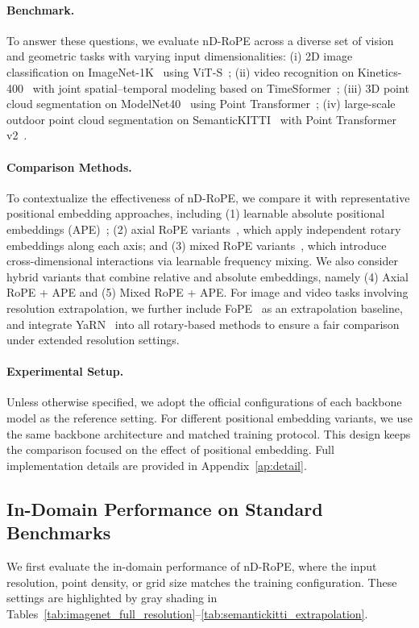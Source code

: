 \documentclass{article}
\theoremstyle{plain}
\theoremstyle{definition}
\theoremstyle{remark}
\begin{document}
\paragraph{Benchmark.} To answer these questions, we evaluate nD-RoPE across a diverse set of vision and geometric tasks with varying input dimensionalities: (i) 2D image classification on ImageNet-1K~\cite{deng2009imagenet} using ViT-S~\cite{dosovitskiy2020image}; (ii) video recognition on Kinetics-400~\cite{kay2017kinetics} with joint spatial--temporal modeling based on TimeSformer~\cite{bertasius2021space}; (iii) 3D point cloud segmentation on ModelNet40~\cite{wu20153d} using Point Transformer~\cite{zhao2021point}; (iv) large-scale outdoor point cloud segmentation on SemanticKITTI~\cite{behley2019iccv} with Point Transformer v2~\cite{wu2022point}.

\paragraph{Comparison Methods.} To contextualize the effectiveness of nD-RoPE, we compare it with representative positional embedding approaches, including (1) learnable absolute positional embeddings (APE)~\cite{devlin2019bert}; (2) axial RoPE variants~\cite{su2024roformer,ma20253d}, which apply independent rotary embeddings along each axis; and (3) mixed RoPE variants~\cite{heo2024rotary,ostmeier2025lierelierotationalpositional}, which introduce cross-dimensional interactions via learnable frequency mixing. We also consider hybrid variants that combine relative and absolute embeddings, namely (4) Axial RoPE + APE and (5) Mixed RoPE + APE. For image and video tasks involving resolution extrapolation, we further include FoPE~\cite{hua2025fope} as an extrapolation baseline, and integrate YaRN~\cite{peng2023yarn} into all rotary-based methods to ensure a fair comparison under extended resolution settings.

\paragraph{Experimental Setup.}
Unless otherwise specified, we adopt the official configurations of each backbone model as the reference setting. For different positional embedding variants, we use the same backbone architecture and matched training protocol. This design keeps the comparison focused on the effect of positional embedding. Full implementation details are provided in Appendix~\ref{ap:detail}.

\subsection{In-Domain Performance on Standard Benchmarks}
\label{subsec:indomain}
We first evaluate the in-domain performance of nD-RoPE, where the input resolution, point density, or grid size matches the training configuration. These settings are highlighted by gray shading in Tables~\ref{tab:imagenet_full_resolution}--\ref{tab:semantickitti_extrapolation}.
\end{document}
